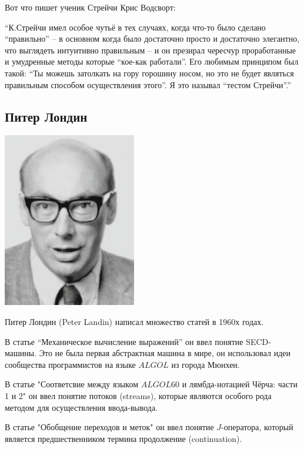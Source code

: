 \documentclass[14pt]{matmex-diploma-custom}
\begin{document}
\begin{framed}
Вот что пишет ученик Стрейчи Крис Водсворт:

“К.Стрейчи имел особое чутьё в тех случаях, когда что-то было сделано “правильно” -- в основном когда было достаточно просто и достаточно элегантно, что выглядеть интуитивно правильным -- и он презирал чересчур проработанные и умудренные методы которые “кое-как работали”. Его любимым принципом был такой: “Ты можешь затолкать на гору горошину носом, но это не будет являться правильным способом осуществления этого”. Я это называл “тестом Стрейчи”.”
\end{framed}

\subsection{Питер Лондин}
\includegraphics[angle=0,scale=0.585]{220px-Peter_Landin.png}

Питер Лондин (Peter Landin) написал множество статей в 1960х годах.

В статье “Механическое вычисление выражений”\cite{laundin1} он ввел понятие SECD-машины. Это не была первая абстрактная машина в мире, он использовал идеи сообщества программистов на языке $ALGOL$ из города Мюнхен. 

В статье "Соответсвие между языком $ALGOL60$ и лямбда-нотацией Чёрча: части 1 и 2"\cite{laundin2} он ввел понятие потоков (streams), которые являются особого рода методом для осуществления ввода-вывода.

В статье "Обобщение переходов и меток" \cite{laundin3} он ввел понятие $J$-оператора, который является предшественником термина продолжение (continuation).
\end{document}
